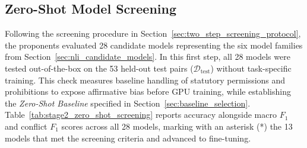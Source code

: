 \subsection{Zero-Shot Model Screening}
Following the screening procedure in Section~\ref{sec:two_step_screening_protocol}, the proponents evaluated 28 candidate models representing the six model families from Section~\ref{sec:nli_candidate_models}. In this first step, all 28 models were tested out-of-the-box on the 53 held-out test pairs ($\mathcal{D}_{\text{test}}$) without task-specific training. This check measures baseline handling of statutory permissions and prohibitions to expose affirmative bias before GPU training, while establishing the \textit{Zero-Shot Baseline} specified in Section~\ref{sec:baseline_selection}. Table~\ref{tab:stage2_zero_shot_screening} reports accuracy alongside macro $F_1$ and conflict $F_1$ scores across all 28 models, marking with an asterisk (*) the 13 models that met the screening criteria and advanced to fine-tuning.

